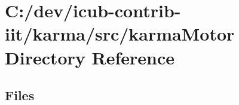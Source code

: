 \section{C\+:/dev/icub-\/contrib-\/iit/karma/src/karma\+Motor Directory Reference}
\label{dir_a61e44ac46e7253a0943cfd762c184f9}
\subsection*{Files}
\begin{DoxyCompactItemize}
\end{DoxyCompactItemize}
